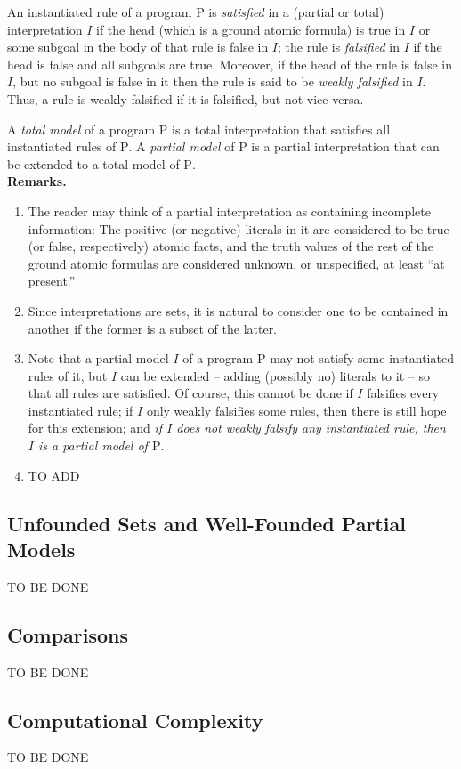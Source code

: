 An instantiated rule of a program $\mathrm{P}$ is \emph{satisfied} in a (partial or total) interpretation $I$ if the head (which is a ground atomic formula) is true in $I$ or some subgoal in the body of that rule is false in $I$; the rule is \emph{falsified} in $I$ if the head is false and all subgoals are true. Moreover, if the head of the rule is false in $I$, but no subgoal is false in it then the rule is said to be \emph{weakly falsified} in $I$. Thus, a rule is weakly falsified if it is falsified, but not vice versa.

A \emph{total model} of a program $\mathrm{P}$ is a total interpretation that satisfies all instantiated rules of $\mathrm{P}$. A \emph{partial model} of $\mathrm{P}$ is a partial interpretation that can be extended to a total model of $\mathrm{P}$.
\ \medskip\\
\noindent\textbf{Remarks.}
\begin{enumerate}[label=(\alph*)]
%
\item The reader may think of a partial interpretation as containing incomplete information: The positive (or negative) literals in it are considered to be true (or false, respectively) atomic facts, and the truth values of the rest of the ground atomic formulas are considered unknown, or unspecified, at least ``at present.''
%
\item Since interpretations are sets, it is natural to consider one to be contained in another if the former is a subset of the latter.
%
\item Note that a partial model $I$ of a program $\mathrm{P}$ may not satisfy some instantiated rules of it, but $I$ can be extended -- adding (possibly no) literals to it -- so that all rules are satisfied. Of course, this cannot be done if $I$ falsifies every instantiated rule; if $I$ only weakly falsifies some rules, then there is still hope for this extension; and \emph{if $I$ does not weakly falsify any instantiated rule, then $I$ is a partial model of $\mathrm{P}$}.
%
\item TO ADD
%
\end{enumerate}

\subsection{Unfounded Sets and Well-Founded Partial Models}
TO BE DONE
\subsection{Comparisons}
TO BE DONE
\subsection{Computational Complexity}
TO BE DONE